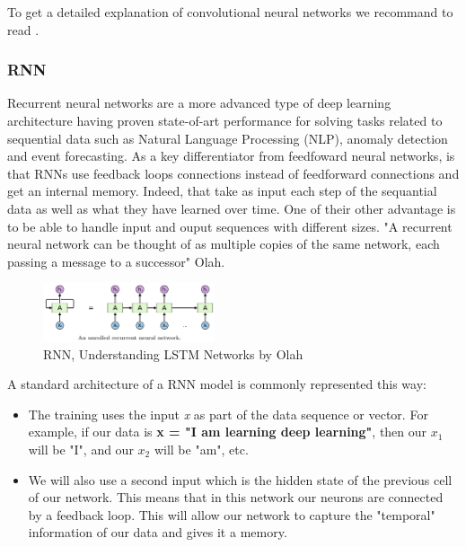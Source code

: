 \documentclass[letter,8pt]{article}\usepackage[]{graphicx}\usepackage[]{color}
\begin{document}
To get a detailed explanation of convolutional neural networks we recommand to read \cite[Chapter 9]{Goodfellow-et-al-2016}.\\

\subsubsection{RNN}
Recurrent neural networks are a more advanced type of deep learning architecture having proven state-of-art performance for solving tasks related to sequential data such as Natural Language Processing (NLP), anomaly detection and event forecasting. As a key differentiator from feedfoward neural networks, is that RNNs use feedback loops connections instead of feedforward connections and get an internal memory. Indeed, that take as input each step of the sequantial data as well as what they have learned over time. One of their other advantage is to be able to handle input and ouput sequences with different sizes. "A recurrent neural network can be thought of as multiple copies of the same network, each passing a message to a successor" Olah.
\begin{figure}
    \begin{center}
    \includegraphics[width=0.45\textwidth]{figure/RNN_process.png}
    \end{center}
     \caption{RNN, Understanding LSTM Networks by Olah}
     \label{fig:rnn_process}
\end{figure}

A standard architecture of a RNN model is commonly
represented this way:
\begin{itemize}
\item The training uses the input \textit{x} as part of the data sequence or vector. For example, if our data is \textbf{x = "I am learning deep learning"}, then our $x_1$ will be "I", and our $x_2$ will be "am", etc.
\item We will also use a second input which is the hidden state of the previous cell of our network. This means that in this network our neurons are connected by a feedback loop. This will allow our network to capture the "temporal" information of our data and gives it a memory. 
\end{itemize}
\end{document}
